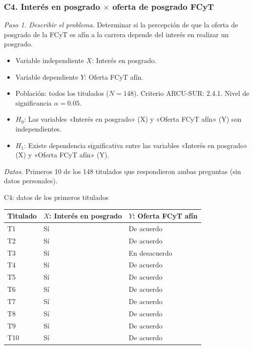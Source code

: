 \subsubsection*{C4. Interés en posgrado $\times$ oferta de posgrado FCyT}

\textit{Paso 1. Describir el problema.} Determinar si la percepción de que la oferta de posgrado de la FCyT es afín a la carrera depende del interés en realizar un posgrado.

\begin{itemize}[nosep]
  \item Variable independiente $X$: Interés en posgrado.
  \item Variable dependiente $Y$: Oferta FCyT afín.
  \item Población: todos los titulados ($N = 148$). Criterio ARCU-SUR: 2.4.1. Nivel de significancia $\alpha = 0.05$.
  \item $H_0$: Las variables «Interés en posgrado» (X) y «Oferta FCyT afín» (Y) son independientes.
  \item $H_1$: Existe dependencia significativa entre las variables «Interés en posgrado» (X) y «Oferta FCyT afín» (Y).
\end{itemize}

\textit{Datos.} Primeros 10 de los 148 titulados que respondieron ambas preguntas (sin datos personales).

\begin{mitabla}{C4: datos de los primeros titulados}
\begin{tabular}{lll}
\toprule
Titulado & $X$: Interés en posgrado & $Y$: Oferta FCyT afín \\
\midrule
T1 & Sí & De acuerdo \\
T2 & Sí & De acuerdo \\
T3 & Sí & En desacuerdo \\
T4 & Sí & De acuerdo \\
T5 & Sí & De acuerdo \\
T6 & Sí & De acuerdo \\
T7 & Sí & De acuerdo \\
T8 & Sí & De acuerdo \\
T9 & Sí & De acuerdo \\
T10 & Sí & De acuerdo \\
\bottomrule
\end{tabular}
\end{mitabla}

